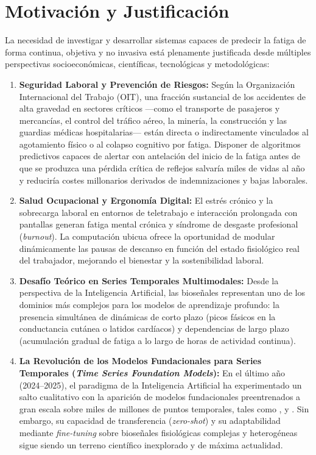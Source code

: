 \section{Motivación y Justificación}
\label{sec:intro_motivacion}

La necesidad de investigar y desarrollar sistemas capaces de predecir la fatiga de forma continua, objetiva y no invasiva está plenamente justificada desde múltiples perspectivas socioeconómicas, científicas, tecnológicas y metodológicas:

\begin{enumerate}[label=\bfseries M\arabic*.]
    \item \textbf{Seguridad Laboral y Prevención de Riesgos:} Según la Organización Internacional del Trabajo (OIT), una fracción sustancial de los accidentes de alta gravedad en sectores críticos ---como el transporte de pasajeros y mercancías, el control del tráfico aéreo, la minería, la construcción y las guardias médicas hospitalarias--- están directa o indirectamente vinculados al agotamiento físico o al colapso cognitivo por fatiga. Disponer de algoritmos predictivos capaces de alertar con antelación del inicio de la fatiga antes de que se produzca una pérdida crítica de reflejos salvaría miles de vidas al año y reduciría costes millonarios derivados de indemnizaciones y bajas laborales.
    \item \textbf{Salud Ocupacional y Ergonomía Digital:} El estrés crónico y la sobrecarga laboral en entornos de teletrabajo e interacción prolongada con pantallas generan fatiga mental crónica y síndrome de desgaste profesional (\textit{burnout}). La computación ubicua ofrece la oportunidad de modular dinámicamente las pausas de descanso en función del estado fisiológico real del trabajador, mejorando el bienestar y la sostenibilidad laboral.
    \item \textbf{Desafío Teórico en Series Temporales Multimodales:} Desde la perspectiva de la Inteligencia Artificial, las bioseñales representan uno de los dominios más complejos para los modelos de aprendizaje profundo: la presencia simultánea de dinámicas de corto plazo (picos fásicos en la conductancia cutánea o latidos cardíacos) y dependencias de largo plazo (acumulación gradual de fatiga a lo largo de horas de actividad continua).
    \item \textbf{La Revolución de los Modelos Fundacionales para Series Temporales (\textit{Time Series Foundation Models}):} En el último año (2024--2025), el paradigma de la Inteligencia Artificial ha experimentado un salto cualitativo con la aparición de modelos fundacionales preentrenados a gran escala sobre miles de millones de puntos temporales, tales como \moment{} \cite{goswami2024moment}, \chronos{} \cite{ansari2024chronos} y \timesfm{} \cite{das2024decoder}. Sin embargo, su capacidad de transferencia (\textit{zero-shot}) y su adaptabilidad mediante \textit{fine-tuning} sobre bioseñales fisiológicas complejas y heterogéneas sigue siendo un terreno científico inexplorado y de máxima actualidad.

\end{enumerate}

